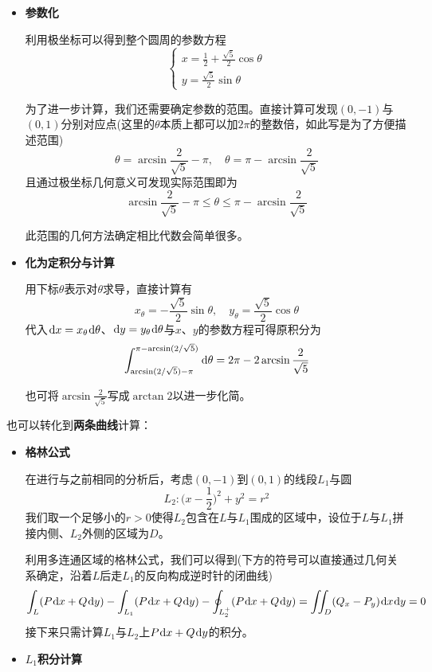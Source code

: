 \documentclass[a4paper,UTF8,fontset=windows,AutoFakeBold]{ctexart}
\newcommand*{\dr}{\hspace{0.07em}\mathrm{d}}
\newcommand*{\note}{\noindent *}
\theoremstyle{ex}
\begin{document}
\begin{framed}
{\begin{itemize}
        \item \textbf{参数化}
        
        利用极坐标可以得到整个圆周的参数方程
        $$\begin{cases}x=\frac{1}{2}+\frac{\sqrt5}{2}\cos\theta\\y=\frac{\sqrt5}{2}\sin\theta\end{cases}$$

        为了进一步计算，我们还需要确定参数的范围。直接计算可发现$(0,-1)$与$(0,1)$分别对应点(这里的$\theta$本质上都可以加$2\pi$的整数倍，如此写是为了方便描述范围)
        $$\theta=\arcsin\frac{2}{\sqrt5}-\pi,\quad\theta=\pi-\arcsin\frac{2}{\sqrt5}$$
        且通过极坐标几何意义可发现实际范围即为
        $$\arcsin\frac{2}{\sqrt5}-\pi\le\theta\le\pi-\arcsin\frac{2}{\sqrt5}$$

        \note 此范围的几何方法确定相比代数会简单很多。

        \item \textbf{化为定积分与计算}
        
        用下标$\theta$表示对$\theta$求导，直接计算有
        $$x_\theta=-\frac{\sqrt5}{2}\sin\theta,\quad y_\theta=\frac{\sqrt5}{2}\cos\theta$$
        代入$\dr x=x_\theta\dr\theta$、$\dr y=y_\theta\dr\theta$与$x$、$y$的参数方程可得原积分为
        $$\int_{\arcsin(2/\sqrt5)-\pi}^{\pi-\arcsin(2/\sqrt5)}\dr\theta=2\pi-2\arcsin\frac{2}{\sqrt5}$$

        \note 也可将$\arcsin\frac{2}{\sqrt5}$写成$\arctan2$以进一步化简。
    \end{itemize}
    也可以转化到\textbf{两条曲线}计算：
    \begin{itemize}
        \item \textbf{格林公式}
        
        在进行与之前相同的分析后，考虑$(0,-1)$到$(0,1)$的线段$L_1$与圆
        $$L_2\colon\bigg(x-\frac{1}{2}\bigg)^2+y^2=r^2$$
        我们取一个足够小的$r>0$使得$L_2$包含在$L$与$L_1$围成的区域中，设位于$L$与$L_1$拼接内侧、$L_2$外侧的区域为$D$。

        利用多连通区域的格林公式，我们可以得到(下方的符号可以直接通过几何关系确定，沿着$L$后走$L_1$的反向构成逆时针的闭曲线)
        $$\int_L(P\dr x+Q\dr y)-\int_{L_1}(P\dr x+Q\dr y)-\oint_{L_2^+}(P\dr x+Q\dr y)=\iint_D(Q_x-P_y)\dr x\dr y=0$$
        接下来只需计算$L_1$与$L_2$上$P\dr x+Q\dr y$的积分。

        \item \textbf{$L_1$积分计算}
        

\end{itemize}}
\end{framed}
\end{document}
